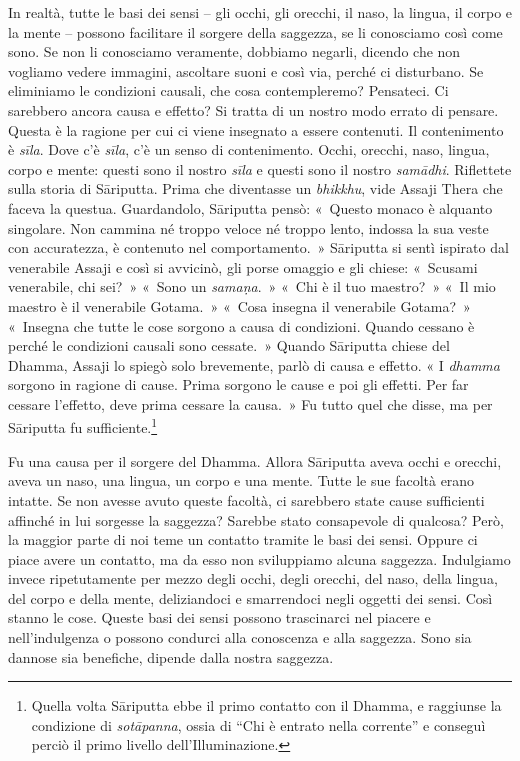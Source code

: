 In realtà, tutte le basi dei sensi -- gli occhi, gli orecchi, il naso,
la lingua, il corpo e la mente -- possono facilitare il sorgere della
saggezza, se li conosciamo così come sono. Se non li conosciamo
veramente, dobbiamo negarli, dicendo che non vogliamo vedere immagini,
ascoltare suoni e così via, perché ci disturbano. Se eliminiamo le
condizioni causali, che cosa contempleremo? Pensateci. Ci sarebbero
ancora causa e effetto? Si tratta di un nostro modo errato di pensare.
Questa è la ragione per cui ci viene insegnato a essere contenuti. Il
contenimento è \emph{sīla}. Dove c'è \emph{sīla}, c'è un senso di
contenimento. Occhi, orecchi, naso, lingua, corpo e mente: questi sono
il nostro \emph{sīla} e questi sono il nostro \emph{samādhi}. Riflettete
sulla storia di Sāriputta. Prima che diventasse un \emph{bhikkhu}, vide
Assaji Thera che faceva la questua. Guardandolo, Sāriputta pensò:
«~Questo monaco è alquanto singolare. Non cammina né troppo veloce né
troppo lento, indossa la sua veste con accuratezza, è contenuto nel
comportamento.~» Sāriputta si sentì ispirato dal venerabile Assaji e
così si avvicinò, gli porse omaggio e gli chiese: «~Scusami venerabile,
chi sei?~» «~Sono un \emph{samaṇa}.~» «~Chi è il tuo maestro?~» «~Il mio
maestro è il venerabile Gotama.~» «~Cosa insegna il venerabile Gotama?~»
«~Insegna che tutte le cose sorgono a causa di condizioni. Quando
cessano è perché le condizioni causali sono cessate.~» Quando Sāriputta
chiese del Dhamma, Assaji lo spiegò solo brevemente, parlò di causa e
effetto. « I \emph{dhamma} sorgono in ragione di cause. Prima sorgono le
cause e poi gli effetti. Per far cessare l'effetto, deve prima cessare
la causa.~» Fu tutto quel che disse, ma per Sāriputta fu
sufficiente.\footnote{Quella volta Sāriputta ebbe il primo contatto con
  il Dhamma, e raggiunse la condizione di \emph{sotāpanna}, ossia di
  ``Chi è entrato nella corrente'' e conseguì perciò il primo livello
  dell'Illuminazione.}

Fu una causa per il sorgere del Dhamma. Allora Sāriputta aveva occhi e
orecchi, aveva un naso, una lingua, un corpo e una mente. Tutte le sue
facoltà erano intatte. Se non avesse avuto queste facoltà, ci sarebbero
state cause sufficienti affinché in lui sorgesse la saggezza? Sarebbe
stato consapevole di qualcosa? Però, la maggior parte di noi teme un
contatto tramite le basi dei sensi. Oppure ci piace avere un contatto,
ma da esso non sviluppiamo alcuna saggezza. Indulgiamo invece
ripetutamente per mezzo degli occhi, degli orecchi, del naso, della
lingua, del corpo e della mente, deliziandoci e smarrendoci negli
oggetti dei sensi. Così stanno le cose. Queste basi dei sensi possono
trascinarci nel piacere e nell'indulgenza o possono condurci alla
conoscenza e alla saggezza. Sono sia dannose sia benefiche, dipende
dalla nostra saggezza.

